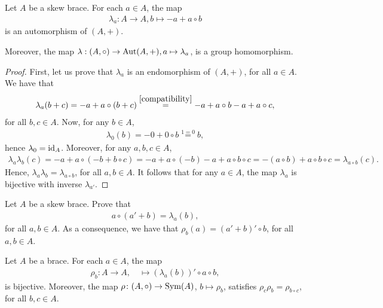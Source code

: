    \begin{proposition}\label{prop:lambda}
        Let $A$ be a skew brace. For each $a\in A$, the map 
        \begin{align*}
            \lambda_a:A\to A, b\mapsto -a + a \circ b
        \end{align*}
    is an automorphism of $(A,+)$. 
    
    Moreover, the map $\lambda: (A,\circ) \to \operatorname{Aut}(A,+), a \mapsto \lambda_a$, is a group homomorphism.
    \end{proposition}

    \begin{proof}
        First, let us prove that $\lambda_a$ is an endomorphism of $(A,+)$, for all $a\in A$.
        We have that
        \begin{align*}
            \lambda_a(b+c) = -a+a\circ (b+c) \overset{\eqref{compatibility}}{=} -a +a\circ b -a +a\circ c,
        \end{align*}
        for all $b,c\in A$. Now, for any $b\in A$,
        \begin{align*}
            \lambda_0(b) = - 0 + 0 \circ b \overset{1=0}{=} b,
        \end{align*}
        hence $\lambda_0=\operatorname{id}_A$. Moreover, for any $a,b,c\in A$, 
        \begin{align*}
            \lambda_a\lambda_b(c) = -a +a\circ(-b+b\circ c) = -a + a\circ(-b) - a + a\circ b \circ c=-(a\circ b) + a\circ b \circ c = \lambda_{a\circ b}(c).
        \end{align*}
        Hence, $\lambda_a\lambda_b=\lambda_{a\circ b}$, for all $a,b\in A$. It follows that for any $a\in A$, the map $\lambda_a$ is bijective with inverse $\lambda_{a'}$. 
    \end{proof}

    \begin{exercise}\label{ex:rho}
        Let $A$ be a skew brace. Prove that 
        \begin{align*}
            a\circ(a'+b) = \lambda_a(b),
        \end{align*}
        for all $a,b\in A$. As a consequence, we have that $\rho_b(a)=(a'+b)'\circ b$, for all $a,b\in A$.
    \end{exercise}

    \begin{proposition}\label{prop:rho}
        Let $A$ be a brace. For each $a\in A$, the map
        \begin{align*}
            \rho_b\colon A\to A,\quad
            \mapsto (\lambda_a(b))'\circ a\circ b,
        \end{align*}
        is bijective. Moreover, the map 
        $\rho\colon (A,\circ)\to\operatorname{Sym}(A)$, $b\mapsto\rho_b$, satisfies $\rho_c\rho_b=\rho_{b\circ c}$, for all $b,c\in A$. 
    \end{proposition}

